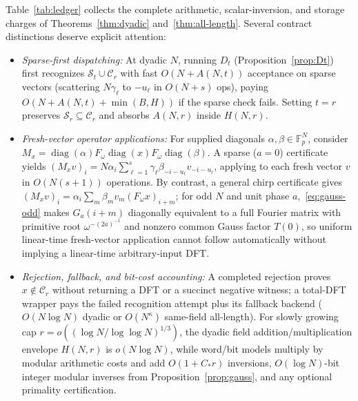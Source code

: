 \documentclass[11pt,reqno]{amsart}
\numberwithin{equation}{section}
\theoremstyle{definition}
\theoremstyle{remark}
\newcommand{\F}{\mathbb{F}}
\newcommand{\diag}{\operatorname{diag}}
\begin{document}
Table~\ref{tab:ledger} collects the complete arithmetic, scalar-inversion, and storage charges of Theorems~\ref{thm:dyadic} and~\ref{thm:all-length}. Several contract distinctions deserve explicit attention:
\begin{itemize}[leftmargin=1.5em]
\item \emph{Sparse-first dispatching:} At dyadic $N$, running $D_t$ (Proposition~\ref{prop:Dt}) first recognizes $\mathcal{S}_t\cup\mathcal{C}_r$ with fast $O(N + A(N,t))$ acceptance on sparse vectors (scattering $N\gamma_\ell$ to $-u_\ell$ in $O(N+s)$ ops), paying $O(N + A(N,t) + \min(B,H))$ if the sparse check fails. Setting $t=r$ preserves $\mathcal{S}_r\subseteq\mathcal{C}_r$ and absorbs $A(N,r)$ inside $H(N,r)$.
\item \emph{Fresh-vector operator applications:} For supplied diagonals $\alpha,\beta\in\F_p^N$, consider $M_x = \diag(\alpha) F_\omega \diag(x) F_\omega \diag(\beta)$. A sparse ($a=0$) certificate yields $(M_x v)_i = N\alpha_i \sum_{\ell=1}^s \gamma_\ell \beta_{-i-u_\ell} v_{-i-u_\ell}$, applying to each fresh vector $v$ in $O(N(s+1))$ operations. By contrast, a general chirp certificate gives $(M_x v)_i = \alpha_i \sum_m \beta_m v_m (F_\omega x)_{i+m}$; for odd $N$ and unit phase $a$,~\eqref{eq:gauss-odd} makes $G_a(i+m)$ diagonally equivalent to a full Fourier matrix with primitive root $\omega^{-(2a)^{-1}}$ and nonzero common Gauss factor $T(0)$, so uniform linear-time fresh-vector application cannot follow automatically without implying a linear-time arbitrary-input DFT.
\item \emph{Rejection, fallback, and bit-cost accounting:} A completed rejection proves $x\notin\mathcal{C}_r$ without returning a DFT or a succinct negative witness; a total-DFT wrapper pays the failed recognition attempt plus its fallback backend ($O(N\log N)$ dyadic or $O(N^\kappa)$ same-field all-length). For slowly growing cap $r = o((\log N / \log\log N)^{1/3})$, the dyadic field addition/multiplication envelope $H(N,r)$ is $o(N\log N)$, while word/bit models multiply by modular arithmetic costs and add $O(1+C_*r)$ inversions, $O(\log N)$-bit integer modular inverses from Proposition~\ref{prop:gauss}, and any optional primality certification.
\end{itemize}
\end{document}
